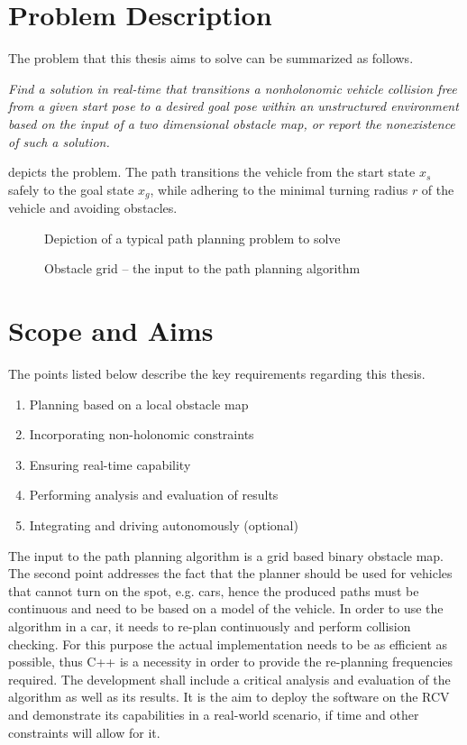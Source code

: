 \section{Problem Description} \label{sec:problemDescription}
The problem that this thesis aims to solve can be summarized as follows.

\emph{Find a solution in real-time that transitions a nonholonomic vehicle collision free from a given start pose to a desired goal pose within an unstructured environment based on the input of a two dimensional obstacle map, or report the nonexistence of such a solution.}

 depicts the problem. The path transitions the vehicle from the start state $x_s$ safely to the goal state $x_g$, while adhering to the minimal turning radius $r$ of the vehicle and avoiding obstacles.

\begin{figure}[h]
\caption{Depiction of a typical path planning problem to solve}
\label{fig:problemDepiction}
\end{figure}

\begin{figure}[h]
\caption[Obstacle grid]{Obstacle grid -- the input to the path planning algorithm}
\label{fig:obstacleGrid}
\end{figure}

\section{Scope and Aims}
The points listed below describe the key requirements regarding this thesis.

\begin{enumerate}
    \item Planning based on a local obstacle map
    \item Incorporating non-holonomic constraints
    \item Ensuring real-time capability
    \item Performing analysis and evaluation of results
    \item Integrating and driving autonomously (optional)
\end{enumerate}

The input to the path planning algorithm is a grid based binary obstacle map. The second point addresses the fact that the planner should be used for vehicles that cannot turn on the spot, e.g. cars, hence the produced paths must be continuous and need to be based on a model of the vehicle. In order to use the algorithm in a car, it needs to re-plan continuously and perform collision checking. For this purpose the actual implementation needs to be as efficient as possible, thus C++ is a necessity in order to provide the re-planning frequencies required. The development shall include a critical analysis and evaluation of the algorithm as well as its results. It is the aim to deploy the software on the RCV and demonstrate its capabilities in a real-world scenario, if time and other constraints will allow for it.

